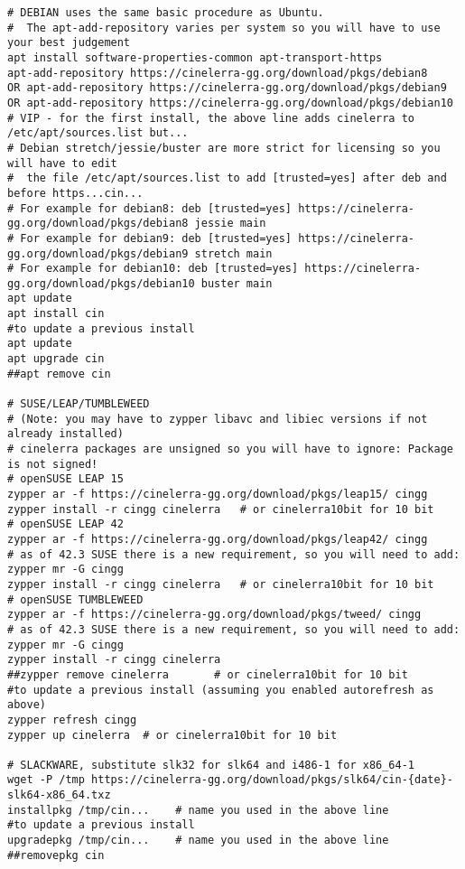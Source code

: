 \begin{lstlisting}[numbers=none]
# DEBIAN uses the same basic procedure as Ubuntu.
#  The apt-add-repository varies per system so you will have to use your best judgement
apt install software-properties-common apt-transport-https
apt-add-repository https://cinelerra-gg.org/download/pkgs/debian8
OR apt-add-repository https://cinelerra-gg.org/download/pkgs/debian9
OR apt-add-repository https://cinelerra-gg.org/download/pkgs/debian10
# VIP - for the first install, the above line adds cinelerra to /etc/apt/sources.list but...
# Debian stretch/jessie/buster are more strict for licensing so you will have to edit
#  the file /etc/apt/sources.list to add [trusted=yes] after deb and before https...cin...
# For example for debian8: deb [trusted=yes] https://cinelerra-gg.org/download/pkgs/debian8 jessie main
# For example for debian9: deb [trusted=yes] https://cinelerra-gg.org/download/pkgs/debian9 stretch main
# For example for debian10: deb [trusted=yes] https://cinelerra-gg.org/download/pkgs/debian10 buster main
apt update
apt install cin
#to update a previous install
apt update
apt upgrade cin
##apt remove cin

# SUSE/LEAP/TUMBLEWEED
# (Note: you may have to zypper libavc and libiec versions if not already installed)
# cinelerra packages are unsigned so you will have to ignore: Package is not signed!
# openSUSE LEAP 15
zypper ar -f https://cinelerra-gg.org/download/pkgs/leap15/ cingg
zypper install -r cingg cinelerra   # or cinelerra10bit for 10 bit
# openSUSE LEAP 42 
zypper ar -f https://cinelerra-gg.org/download/pkgs/leap42/ cingg
# as of 42.3 SUSE there is a new requirement, so you will need to add:
zypper mr -G cingg
zypper install -r cingg cinelerra   # or cinelerra10bit for 10 bit
# openSUSE TUMBLEWEED
zypper ar -f https://cinelerra-gg.org/download/pkgs/tweed/ cingg
# as of 42.3 SUSE there is a new requirement, so you will need to add:
zypper mr -G cingg
zypper install -r cingg cinelerra
##zypper remove cinelerra	    # or cinelerra10bit for 10 bit
#to update a previous install (assuming you enabled autorefresh as above)
zypper refresh cingg
zypper up cinelerra  # or cinelerra10bit for 10 bit

# SLACKWARE, substitute slk32 for slk64 and i486-1 for x86_64-1
wget -P /tmp https://cinelerra-gg.org/download/pkgs/slk64/cin-{date}-slk64-x86_64.txz
installpkg /tmp/cin...    # name you used in the above line
#to update a previous install
upgradepkg /tmp/cin...    # name you used in the above line
##removepkg cin


\end{lstlisting}
